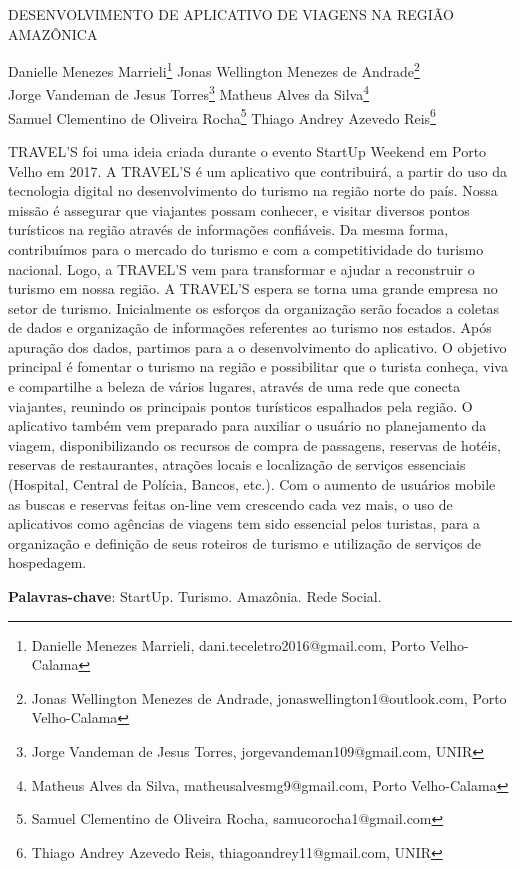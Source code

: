 \documentclass[article,12pt,onesidea,4paper,english,brazil]{abntex2}
\begin{document}
	
	
	\frenchspacing 
	
	\begin{center}
		\LARGE DESENVOLVIMENTO DE APLICATIVO DE VIAGENS NA REGIÃO AMAZÔNICA
		
		\normalsize
		Danielle Menezes Marrieli\footnote{Danielle Menezes Marrieli, dani.teceletro2016@gmail.com, Porto Velho-Calama} 
		Jonas Wellington Menezes de Andrade\footnote{Jonas Wellington Menezes de Andrade, jonaswellington1@outlook.com, Porto Velho-Calama} \\
		Jorge Vandeman de Jesus Torres\footnote{Jorge Vandeman de Jesus Torres, jorgevandeman109@gmail.com, UNIR} 
		Matheus Alves da Silva\footnote{Matheus Alves da Silva, matheusalvesmg9@gmail.com, Porto Velho-Calama} \\
		Samuel Clementino de Oliveira Rocha\footnote{Samuel Clementino de Oliveira Rocha, samucorocha1@gmail.com}
		Thiago Andrey Azevedo Reis\footnote{Thiago Andrey Azevedo Reis, thiagoandrey11@gmail.com, UNIR} 
	\end{center}
	
	\noindent TRAVEL'S foi uma ideia criada durante o evento StartUp Weekend em Porto Velho em 2017. A TRAVEL'S é um aplicativo que contribuirá, a partir do uso da tecnologia
	digital no desenvolvimento do turismo na região norte do país. Nossa missão é
	assegurar que viajantes possam conhecer, e visitar diversos pontos turísticos na
	região através de informações confiáveis. Da mesma forma, contribuímos para o
	mercado do turismo e com a competitividade do turismo nacional. Logo, a TRAVEL'S
	vem para transformar e ajudar a reconstruir o turismo em nossa região. A TRAVEL'S
	espera se torna uma grande empresa no setor de turismo. Inicialmente os esforços
	da organização serão focados a coletas de dados e organização de informações
	referentes ao turismo nos estados. Após apuração dos dados, partimos para a o
	desenvolvimento do aplicativo. O objetivo principal é fomentar o turismo na região e
	possibilitar que o turista conheça, viva e compartilhe a beleza de vários lugares,
	através de uma rede que conecta viajantes, reunindo os principais pontos turísticos
	espalhados pela região. O aplicativo também vem preparado para auxiliar o usuário
	no planejamento da viagem, disponibilizando os recursos de compra de passagens,
	reservas de hotéis, reservas de restaurantes, atrações locais e localização de
	serviços essenciais (Hospital, Central de Polícia, Bancos, etc.). Com o aumento de
	usuários mobile as buscas e reservas feitas on-line vem crescendo cada vez mais, o
	uso de aplicativos como agências de viagens tem sido essencial pelos turistas, para
	a organização e definição de seus roteiros de turismo e utilização de serviços de
	hospedagem.
	
	\vspace{\onelineskip}
	
	\noindent
	\textbf{Palavras-chave}: StartUp. Turismo. Amazônia. Rede Social.
	
\end{document}

